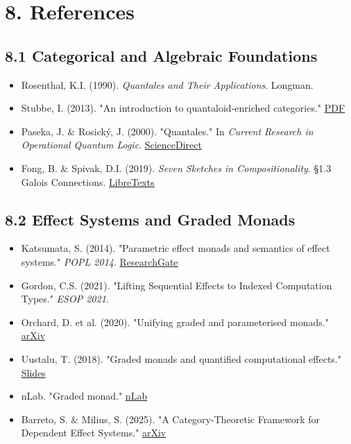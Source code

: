 \documentclass[11pt]{article}
\begin{document}
\section{8. References}
\label{sec:orgfad1baf}

\subsection{8.1 Categorical and Algebraic Foundations}
\label{sec:orgec69fb9}

\begin{itemize}
\item Rosenthal, K.I. (1990). \emph{Quantales and Their Applications}. Longman.
\item Stubbe, I. (2013). "An introduction to quantaloid-enriched categories."
\href{https://www-lmpa.univ-littoral.fr/\~stubbe/PDF/SurveyQCats.pdf}{PDF}
\item Paseka, J. \& Rosický, J. (2000). "Quantales." In \emph{Current Research in
Operational Quantum Logic}.
\href{https://www.sciencedirect.com/science/article/abs/pii/S1570795407050061}{ScienceDirect}
\item Fong, B. \& Spivak, D.I. (2019). \emph{Seven Sketches in Compositionality}. §1.3
Galois Connections.
\href{https://math.libretexts.org/Bookshelves/Applied\_Mathematics/Seven\_Sketches\_in\_Compositionality:\_An\_Invitation\_to\_Applied\_Category\_Theory\_(Fong\_and\_Spivak)/01:\_Generative\_Effects\_-\_Orders\_and\_Adjunctions/1.03:\_Galois\_Connections}{LibreTexts}
\end{itemize}
\subsection{8.2 Effect Systems and Graded Monads}
\label{sec:org0198fb9}

\begin{itemize}
\item Katsumata, S. (2014). "Parametric effect monads and semantics of effect
systems." \emph{POPL 2014}.
\href{https://www.researchgate.net/publication/262368930\_Parametric\_Effect\_Monads\_and\_Semantics\_of\_Effect\_Systems}{ResearchGate}
\item Gordon, C.S. (2021). "Lifting Sequential Effects to Indexed
Computation Types." \emph{ESOP 2021}.
\item Orchard, D. et al. (2020). "Unifying graded and parameterised monads."
\href{https://arxiv.org/pdf/2001.10274}{arXiv}
\item Uustalu, T. (2018). "Graded monads and quantified computational effects."
\href{https://mta.ca/\~rrosebru/FMCS2018/Slides/Uustalu.pdf}{Slides}
\item nLab. "Graded monad."
\href{https://ncatlab.org/nlab/show/graded+monad}{nLab}
\item Barreto, S. \& Milius, S. (2025). "A Category-Theoretic Framework for
Dependent Effect Systems."
\href{https://arxiv.org/html/2601.14846}{arXiv}
\end{itemize}
\end{document}
